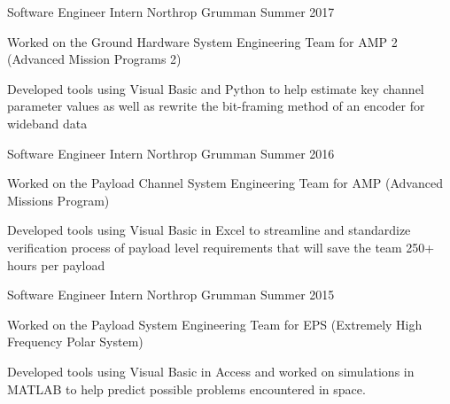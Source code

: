 \vspace{-2mm}
\vspace{-3mm}



\begin{cventries}
  \cventry
    {Software Engineer Intern} %
    {Northrop Grumman} %
    {Summer 2017} %
    {} %
    {
      \begin{cvitems} %
        \item {Worked on the Ground Hardware System Engineering Team for AMP 2 (Advanced Mission Programs 2)}
        \item {Developed tools using Visual Basic and Python to help estimate key channel parameter values as well as rewrite the bit-framing method of an encoder for wideband data}
      \end{cvitems}
    }


  \cventry
    {Software Engineer Intern} %
    {Northrop Grumman} %
    {Summer 2016} %
    {} %
    {
      \begin{cvitems} %
        \item {Worked on the Payload Channel System Engineering Team for AMP (Advanced Missions Program)}
        \item {Developed tools using Visual Basic in Excel to streamline and standardize verification process of payload level requirements that will save the team 250+ hours per payload}
      \end{cvitems}
    }

  \cventry
    {Software Engineer Intern} %
    {Northrop Grumman} %
    {Summer 2015} %
    {} %
    {
      \begin{cvitems} %
        \item {Worked on the Payload System Engineering Team for EPS (Extremely High Frequency Polar System)}
        \item {Developed tools using Visual Basic in Access and worked on simulations in MATLAB to help predict possible problems encountered in space.}
      \end{cvitems}
    }


\end{cventries}
